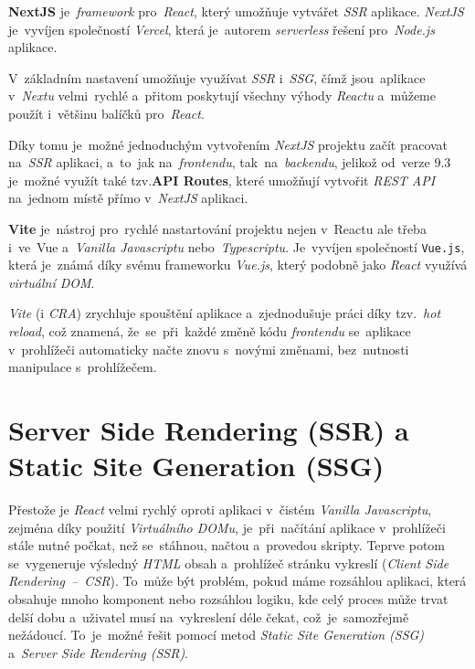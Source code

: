 \documentclass[11pt,a4paper]{report}
\begin{document}
            \textbf{NextJS} je~\emph{framework} pro~\emph{React}, který umožňuje vytvářet \emph{SSR} aplikace. \emph{NextJS} je~vyvíjen společností \emph{Vercel}, která je~autorem \emph{serverless} řešení pro~\emph{Node.js} aplikace.

            V~základním nastavení umožňuje využívat \emph{SSR} i~\emph{SSG}, čímž jsou~aplikace v~\emph{Nextu} velmi~rychlé a~přitom poskytují všechny výhody \emph{Reactu} a~můžeme použít i~většinu balíčků pro~\emph{React}.

            Díky tomu je~možné jednoduchým vytvořením \emph{NextJS} projektu začít pracovat na~\emph{SSR} aplikaci, a~to~jak na~\emph{frontendu}, tak~na~\emph{backendu}, jelikož od~verze 9.3 je~možné využít také tzv.\textbf{API Routes}, které umožňují vytvořit \emph{REST API} na~jednom místě přímo v~\emph{NextJS} aplikaci. \cite{nextjs, nextjs-api-routes, nextjs-changelog-9-3}

            \textbf{Vite} je~nástroj pro~rychlé nastartování projektu nejen v~Reactu ale třeba i~ve~Vue a~\emph{Vanilla Javascriptu} nebo~\emph{Typescriptu}. Je~vyvíjen společností \texttt{Vue.js}, která je~známá díky svému frameworku \emph{Vue.js}, který podobně jako \emph{React} využívá \emph{virtuální DOM}.

            \emph{Vite} (i \emph{CRA}) zrychluje spouštění aplikace a~zjednodušuje práci díky tzv.~\emph{hot reload}, což znamená, že~se~při~každé změně kódu \emph{frontendu} se~aplikace v~prohlížeči automaticky načte znovu s~novými změnami, bez~nutnosti manipulace s~prohlížečem. \cite{vitejs}

        \section{Server Side Rendering (SSR) a Static Site Generation (SSG)}
            Přestože je \emph{React} velmi rychlý oproti aplikaci v~čistém \emph{Vanilla Javascriptu}, zejména díky použití \emph{Virtuálního DOMu}, je~při~načítání aplikace v~prohlížeči stále nutné počkat, než se~stáhnou, načtou a~provedou skripty. Teprve potom se~vygeneruje výsledný \emph{HTML} obsah a~prohlížeč stránku vykreslí (\emph{Client Side Rendering~--~CSR})\cite{mediumWhatCSR}. To~může být problém, pokud máme rozsáhlou aplikaci, která obsahuje mnoho komponent nebo rozsáhlou logiku, kde celý proces může trvat delší dobu a~uživatel musí na~vykreslení déle čekat, což~je~samozřejmě nežádoucí. To~je~možné řešit pomocí metod \emph{Static Site Generation (SSG)} a~\emph{Server Side Rendering (SSR)}.
\end{document}
